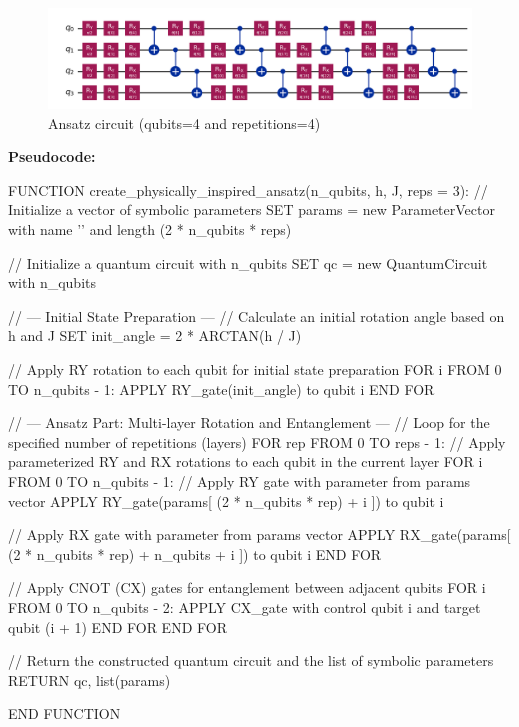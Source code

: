 \documentclass[a4paper]{article}
\begin{document}
\begin{figure}[htbp]
    \centering
    \includegraphics[width=0.5\linewidth]{images/ansatz.png}
    \caption{Ansatz circuit (qubits=4 and repetitions=4)}
    \label{4}
\end{figure}

\textbf{Pseudocode:}
\begin{scala}
    FUNCTION create_physically_inspired_ansatz(n_qubits, h, J, reps = 3):
    // Initialize a vector of symbolic parameters
    SET params = new ParameterVector with name '\theta' and length (2 * n_qubits * reps)

    // Initialize a quantum circuit with n_qubits
    SET qc = new QuantumCircuit with n_qubits

    // --- Initial State Preparation ---
    // Calculate an initial rotation angle based on h and J
    SET init_angle = 2 * ARCTAN(h / J)

    // Apply RY rotation to each qubit for initial state preparation
    FOR i FROM 0 TO n_qubits - 1:
        APPLY RY_gate(init_angle) to qubit i
    END FOR

    // --- Ansatz Part: Multi-layer Rotation and Entanglement ---
    // Loop for the specified number of repetitions (layers)
    FOR rep FROM 0 TO reps - 1:
        // Apply parameterized RY and RX rotations to each qubit in the current layer
        FOR i FROM 0 TO n_qubits - 1:
            // Apply RY gate with parameter from params vector
            APPLY RY_gate(params[ (2 * n_qubits * rep) + i ]) to qubit i

            // Apply RX gate with parameter from params vector
            APPLY RX_gate(params[ (2 * n_qubits * rep) + n_qubits + i ]) to qubit i
        END FOR

        // Apply CNOT (CX) gates for entanglement between adjacent qubits
        FOR i FROM 0 TO n_qubits - 2:
            APPLY CX_gate with control qubit i and target qubit (i + 1)
        END FOR
    END FOR

    // Return the constructed quantum circuit and the list of symbolic parameters
    RETURN qc, list(params)

END FUNCTION
\end{scala}
\end{document}
